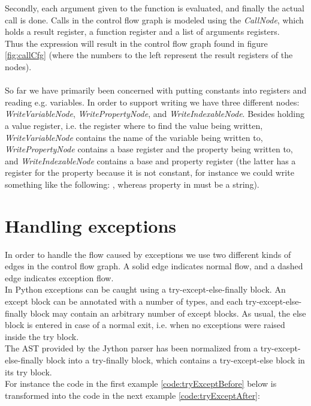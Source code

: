 Secondly, each argument given to the function is evaluated, and finally the actual call is done. Calls in the control flow graph is modeled using the \textit{CallNode}, which holds a result register, a function register and a list of arguments registers. \\
Thus the expression  will result in the control flow graph found in figure \ref{fig:callCfg} (where the numbers to the left represent the result registers of the nodes).\\
 \\
So far we have primarily been concerned with putting constants into registers and reading e.g. variables. In order to support writing we have three different nodes: \textit{WriteVariableNode}, \textit{WritePropertyNode}, and \textit{WriteIndexableNode}. Besides holding a value register, i.e. the register where to find the value being written, \textit{WriteVariableNode} contains the name of the variable being written to, \textit{WritePropertyNode} contains a base register and the property being written to, and \textit{WriteIndexableNode} contains a base and property register (the latter has a register for the property because it is not constant, for instance we could write something like the following: , whereas property in  must be a string).

\section{Handling exceptions}
In order to handle the flow caused by exceptions we use two different kinds of edges in the control flow graph. A solid edge indicates normal flow, and a dashed edge indicates exception flow. \\
In Python exceptions can be caught using a try-except-else-finally block. An except block can be annotated with a number of types, and each try-except-else-finally block may contain an arbitrary number of except blocks. As usual, the else block is entered in case of a normal exit, i.e. when no exceptions were raised inside the try block. \\
The AST provided by the Jython parser has been normalized from a try-except-else-finally block into a try-finally block, which contains a try-except-else block in its try block. \\
For instance the code in the first example \ref{code:tryExceptBefore} below is transformed into the code in the next example \ref{code:tryExceptAfter}:

